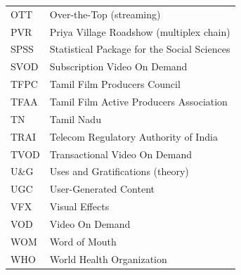 \begin{tabularx}{\textwidth}{l X}
OTT       & Over-the-Top (streaming) \\
PVR       & Priya Village Roadshow (multiplex chain) \\
SPSS      & Statistical Package for the Social Sciences \\
SVOD      & Subscription Video On Demand \\
TFPC      & Tamil Film Producers Council \\
TFAA      & Tamil Film Active Producers Association \\
TN        & Tamil Nadu \\
TRAI      & Telecom Regulatory Authority of India \\
TVOD      & Transactional Video On Demand \\
U\&G      & Uses and Gratifications (theory) \\
UGC       & User-Generated Content \\
VFX       & Visual Effects \\
VOD       & Video On Demand \\
WOM       & Word of Mouth \\
WHO       & World Health Organization \\
\bottomrule
\end{tabularx}
\clearpage
